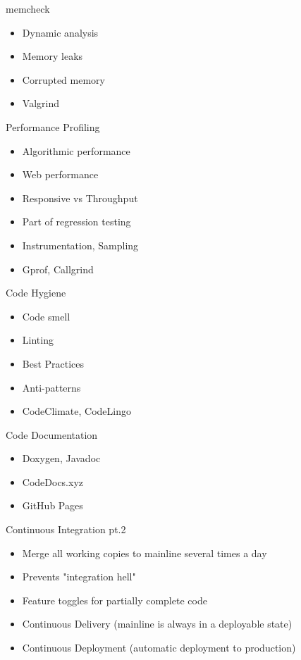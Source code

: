 \documentclass{beamer}
\begin{document}
\begin{frame}{memcheck}
	\begin{itemize}
		\item Dynamic analysis
		\item Memory leaks
		\item Corrupted memory
		\item Valgrind
	\end{itemize}
\end{frame}

\begin{frame}{Performance Profiling}
	\begin{itemize}
		\item Algorithmic performance
		\item Web performance
		\item Responsive vs Throughput
		\item Part of regression testing
		\item Instrumentation, Sampling
		\item Gprof, Callgrind
	\end{itemize}
\end{frame}

\begin{frame}{Code Hygiene}
	\begin{itemize}
		\item Code smell
		\item Linting
		\item Best Practices
		\item Anti-patterns
		\item CodeClimate, CodeLingo
	\end{itemize}
\end{frame}

\begin{frame}{Code Documentation}
	\begin{itemize}
		\item Doxygen, Javadoc
		\item CodeDocs.xyz
		\item GitHub Pages
	\end{itemize}
\end{frame}

\begin{frame}{Continuous Integration pt.2}
	\begin{itemize}
		\item Merge all working copies to mainline several times a day
		\item Prevents "integration hell"
		\item Feature toggles for partially complete code
		\item Continuous Delivery (mainline is always in a deployable state)
		\item Continuous Deployment (automatic deployment to production)
	\end{itemize}
\end{frame}
\end{document}
